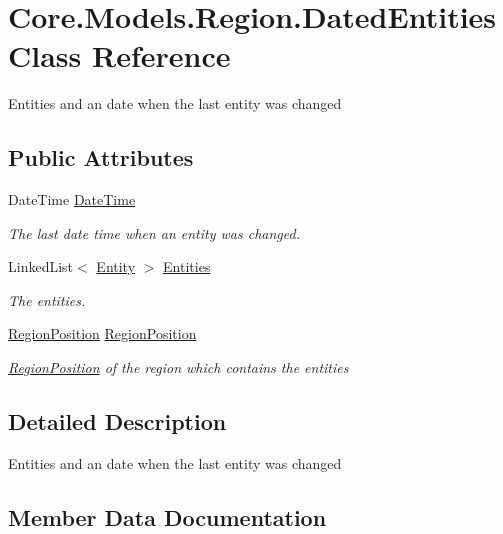 \hypertarget{classCore_1_1Models_1_1Region_1_1DatedEntities}{}\section{Core.\+Models.\+Region.\+Dated\+Entities Class Reference}
\label{classCore_1_1Models_1_1Region_1_1DatedEntities}


Entities and an date when the last entity was changed  


\subsection*{Public Attributes}
\begin{DoxyCompactItemize}
\item 
Date\+Time \hyperlink{classCore_1_1Models_1_1Region_1_1DatedEntities_aef27626e67d6fbe5e549f57bf1233571}{Date\+Time}
\begin{DoxyCompactList}\small\item\em The last date time when an entity was changed. \end{DoxyCompactList}\item 
Linked\+List$<$ \hyperlink{classCore_1_1Models_1_1Entity}{Entity} $>$ \hyperlink{classCore_1_1Models_1_1Region_1_1DatedEntities_aaa8cacb9e8c527149f8176ad2b473bdc}{Entities}
\begin{DoxyCompactList}\small\item\em The entities. \end{DoxyCompactList}\item 
\hyperlink{classCore_1_1Models_1_1RegionPosition}{Region\+Position} \hyperlink{classCore_1_1Models_1_1Region_1_1DatedEntities_a9f7508c71a4e63dd41df20a6699c4359}{Region\+Position}
\begin{DoxyCompactList}\small\item\em \hyperlink{classCore_1_1Models_1_1RegionPosition}{Region\+Position} of the region which contains the entities \end{DoxyCompactList}\end{DoxyCompactItemize}


\subsection{Detailed Description}
Entities and an date when the last entity was changed 



\subsection{Member Data Documentation}
\hypertarget{classCore_1_1Models_1_1Region_1_1DatedEntities_aef27626e67d6fbe5e549f57bf1233571}{}
